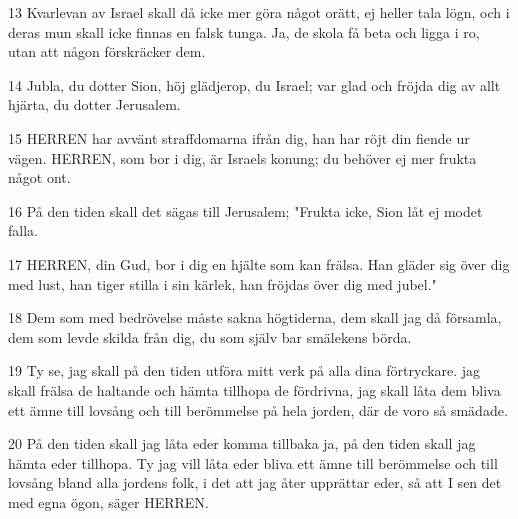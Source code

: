 \par 13 Kvarlevan av Israel skall då icke mer göra något orätt, ej heller tala lögn, och i deras mun skall icke finnas en falsk tunga. Ja, de skola få beta och ligga i ro, utan att någon förskräcker dem.
\par 14 Jubla, du dotter Sion, höj glädjerop, du Israel; var glad och fröjda dig av allt hjärta, du dotter Jerusalem.
\par 15 HERREN har avvänt straffdomarna ifrån dig, han har röjt din fiende ur vägen. HERREN, som bor i dig, är Israels konung; du behöver ej mer frukta något ont.
\par 16 På den tiden skall det sägas till Jerusalem; "Frukta icke, Sion låt ej modet falla.
\par 17 HERREN, din Gud, bor i dig en hjälte som kan frälsa. Han gläder sig över dig med lust, han tiger stilla i sin kärlek, han fröjdas över dig med jubel."
\par 18 Dem som med bedrövelse måste sakna högtiderna, dem skall jag då församla, dem som levde skilda från dig, du som själv bar smälekens börda.
\par 19 Ty se, jag skall på den tiden utföra mitt verk på alla dina förtryckare. jag skall frälsa de haltande och hämta tillhopa de fördrivna, jag skall låta dem bliva ett ämne till lovsång och till berömmelse på hela jorden, där de voro så smädade.
\par 20 På den tiden skall jag låta eder komma tillbaka ja, på den tiden skall jag hämta eder tillhopa. Ty jag vill låta eder bliva ett ämne till berömmelse och till lovsång bland alla jordens folk, i det att jag åter upprättar eder, så att I sen det med egna ögon, säger HERREN.


